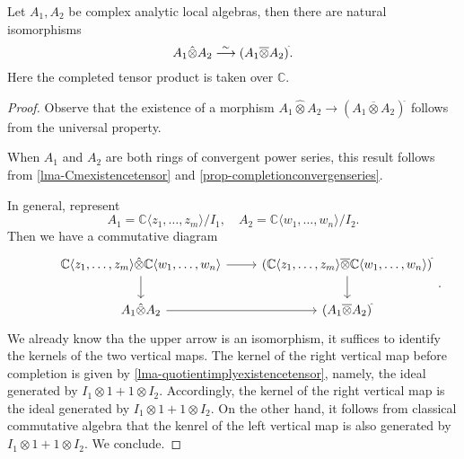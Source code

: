 \begin{theorem}
    Let $A_1,A_2$ be complex analytic local algebras, then there are natural isomorphisms
    \[
      A_1\hat{\otimes} A_2 \stackrel{\sim}{\longrightarrow}  (A_1\overline{\otimes} A_2)^{\hat{}}.
    \]
    Here the completed tensor product is taken over $\mathbb{C}$.
\end{theorem}
\begin{proof}
    Observe that the existence of a morphism $A_1\hat{\otimes} A_2 \rightarrow  (A_1\overline{\otimes} A_2)^{\hat{}}$ follows from the universal property.

    When $A_1$ and $A_2$ are both rings of convergent power series, this result follows from \cref{lma-Cmexistencetensor} and \cref{prop-completionconvergenseries}. 

    In general, represent 
    \[
        A_1=\mathbb{C}\langle z_1,\ldots,z_m\rangle/I_1,\quad   A_2=\mathbb{C}\langle w_1,\ldots,w_n\rangle/I_2.
    \]
    Then we have a commutative diagram
    \[ 
    \begin{tikzcd}
        & \mathbb{C}\langle z_1,\ldots,z_m\rangle \hat{\otimes}  \mathbb{C}\langle w_1,\ldots,w_n\rangle \arrow[r]\arrow[d] & (\mathbb{C}\langle z_1,\ldots,z_m\rangle\overline{\otimes} \mathbb{C}\langle w_1,\ldots,w_n\rangle)^{\hat{}} \arrow[d]\\
        & A_1\hat{\otimes} A_2 \arrow[r] & (A_1\overline{\otimes} A_2)^{\hat{}}
    \end{tikzcd}.
    \]
    We already know tha the upper arrow is an isomorphism, it suffices to identify the kernels of the two vertical maps. The kernel of the right vertical map before completion is given by \cref{lma-quotientimplyexistencetensor}, namely, the ideal generated by $I_1\otimes 1+1\otimes I_2$. Accordingly, the kernel of the right vertical map is the ideal generated by $I_1\otimes 1+1\otimes I_2$. On the other hand, it follows from classical commutative algebra that the kenrel of the left vertical map is also generated by $I_1\otimes 1+1\otimes I_2$. We conclude.
\end{proof}


\printbibliography
